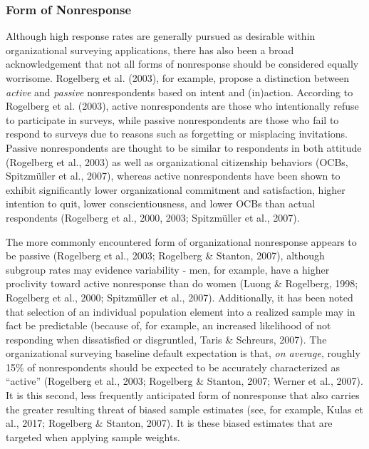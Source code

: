 \documentclass[
  man,mask]{apa7}
\begin{document}
\hypertarget{form-of-nonresponse}{%
\subsubsection{Form of Nonresponse}\label{form-of-nonresponse}}

Although high response rates are generally pursued as desirable within organizational surveying applications, there has also been a broad acknowledgement that not all forms of nonresponse should be considered equally worrisome. Rogelberg et al. (2003), for example, propose a distinction between \emph{active} and \emph{passive} nonrespondents based on intent and (in)action. According to Rogelberg et al. (2003), active nonrespondents are those who intentionally refuse to participate in surveys, while passive nonrespondents are those who fail to respond to surveys due to reasons such as forgetting or misplacing invitations. Passive nonrespondents are thought to be similar to respondents in both attitude (Rogelberg et al., 2003) as well as organizational citizenship behaviors (OCBs, Spitzmüller et al., 2007), whereas active nonrespondents have been shown to exhibit significantly lower organizational commitment and satisfaction, higher intention to quit, lower conscientiousness, and lower OCBs than actual respondents (Rogelberg et al., 2000, 2003; Spitzmüller et al., 2007).

The more commonly encountered form of organizational nonresponse appears to be passive (Rogelberg et al., 2003; Rogelberg \& Stanton, 2007), although subgroup rates may evidence variability - men, for example, have a higher proclivity toward active nonresponse than do women (Luong \& Rogelberg, 1998; Rogelberg et al., 2000; Spitzmüller et al., 2007). Additionally, it has been noted that selection of an individual population element into a realized sample may in fact be predictable (because of, for example, an increased likelihood of not responding when dissatisfied or disgruntled, Taris \& Schreurs, 2007). The organizational surveying baseline default expectation is that, \emph{on average}, roughly 15\% of nonrespondents should be expected to be accurately characterized as ``active'' (Rogelberg et al., 2003; Rogelberg \& Stanton, 2007; Werner et al., 2007). It is this second, less frequently anticipated form of nonresponse that also carries the greater resulting threat of biased sample estimates (see, for example, Kulas et al., 2017; Rogelberg \& Stanton, 2007). It is these biased estimates that are targeted when applying sample weights.
\end{document}
